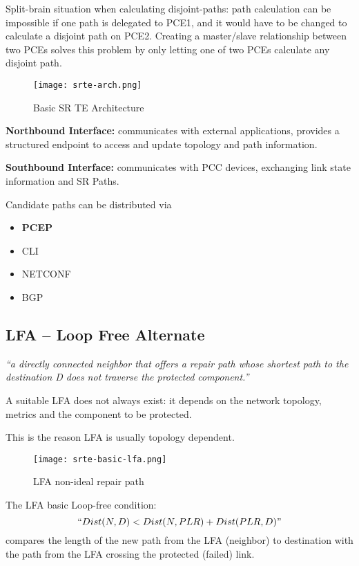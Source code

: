 Split-brain situation when calculating disjoint-paths: path calculation can be impossible if one path is delegated to PCE1, and it
would have to be changed to calculate a disjoint path on PCE2. Creating a master/slave relationship between two PCEs solves this problem by only letting one 
of two PCEs calculate any disjoint path. 

\begin{figure}[]
    \centering
    \texttt{[image: srte-arch.png]}
    \caption{Basic SR TE Architecture}
\end{figure}

\textbf{Northbound Interface:} communicates with external applications, provides a structured endpoint 
to access and update topology and path information.

\textbf{Southbound Interface:} communicates with PCC devices, exchanging link state information and SR Paths. 

\noindent
Candidate paths can be distributed via 
\begin{itemize}
    \item \textbf{PCEP}
    \item CLI
    \item NETCONF
    \item BGP 
\end{itemize}


\subsection{LFA -- Loop Free Alternate}
\emph{``a directly connected neighbor that offers a repair path whose shortest path to the destination D does not traverse the protected component.''}

 
A suitable LFA does not always exist: it depends on the network topology, metrics and the component to be protected.

This is the reason LFA is usually topology dependent.

\begin{figure}
    \centering
    \texttt{[image: srte-basic-lfa.png]}
    \caption{LFA non-ideal repair path}
\end{figure}

\vspace{5mm} \noindent
The LFA basic Loop-free condition:
\emph{\[ ``Dist(N,D) < Dist(N,PLR) + Dist(PLR,D)" \]}
compares the length of the new path from the LFA (neighbor) to destination with the path from the LFA crossing the protected (failed) link.  

